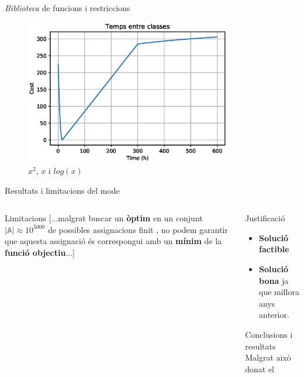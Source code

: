 \documentclass[twocolumn]{beamer}
\begin{document}
\begin{frame}{\textit{Biblioteca} de funcions i restriccions}
\begin{figure}
	\includegraphics[width=9cm]{interclass}
	\caption{$x^2$, $x$ i $log(x)$}
\end{figure}
\end{frame}


\begin{frame}{Resultats i limitacions del mode}
\begin{columns}[t]
	\begin{column}{.5\textwidth}
		\begin{block}{Limitacions}
			[...malgrat buscar un \textbf{òptim} en un conjunt $|\mathbb{A}|\approx10^{5000}$ de possibles assignacions finit , no podem garantir que aquesta assignació és correspongui amb un  \textbf{mínim} de la \textbf{funció objectiu}...]
		\end{block}
		
	\end{column}
	\begin{column}{.5\textwidth}
		
		\begin{block}{Justificació}
			\begin{itemize}
				\item \textbf{Solució factible}
				\item \textbf{Solució bona} ja que millora anys anterior.
			\end{itemize}
		\end{block}
		\begin{block}{Conclusions i resultats}
			Malgrat això donat el
		\end{block}
	\end{column}
\end{columns}
\end{frame}
\end{document}

